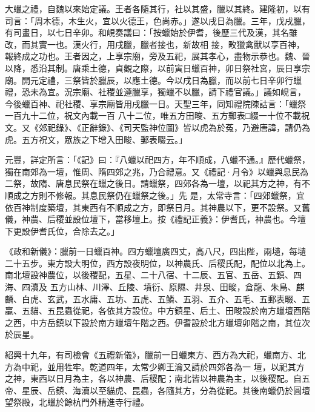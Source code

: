 \begin{pinyinscope}
 大蠟之禮，自魏以來始定議。王者各隨其行，社以其盛，臘以其終。建隆初，以有司言：「周木德，木生火，宜以火德王，色尚赤。」遂以戌日為臘。三年，戊戌臘，有司畫日，以七日辛卯。和峴奏議曰：「按蠟始於伊耆，後歷三代及漢，其名雖改，而其實一也。漢火行，用戌臘，臘者接也，新故相
 接，畋獵禽獸以享百神，報終成之功也。王者因之，上享宗廟，旁及五祀，展其孝心，盡物示恭也。魏、晉以降，悉沿其制。唐乘土德，貞觀之際，以前寅日蠟百神，卯日祭社宮，辰日享宗廟。開元定禮，三祭皆於臘辰，以應土德。今以戌日為臘，而以前七日辛卯行蠟禮，恐未為宜。況宗廟、社稷並遵臘享，獨蠟不以臘，請下禮官議。」議如峴言，今後蠟百神、祀社稷、享宗廟皆用戌臘一日。天聖三年，同知禮院陳詁言：「蠟祭一百九十二位，祝文內載一百
 八十二位，唯五方田畯、五方郵表□綴一十位不載祝文。又《郊祀錄》、《正辭錄》、《司天監神位圖》皆以虎為於菟，乃避唐諱，請仍為虎。五方祝文，眾族之下增入田畯、郵表畷云。」



 元豐，詳定所言：「《記》曰：『八蠟以祀四方，年不順成，八蠟不通。』歷代蠟祭，獨在南郊為一壇，惟周、隋四郊之兆，乃合禮意。又《禮記·月令》以蠟與息民為二祭，故隋、唐息民祭在蠟之後日。請蠟祭，四郊各為一壇，以祀其方之神，有不順成之方則不修報。其息民祭仍在蠟祭之後。」先
 是，太常寺言：「四郊蠟祭，宜依百神制度築壇，其東西有不順成之方，即祭日月。其神農以下，更不設祭。又舊儀，神農、后稷並設位壇下，當移壇上。按《禮記正義》：伊耆氏，神農也。今壇下更設伊耆氏位，合除去之。」



 《政和新儀》：臘前一日蠟百神。四方蠟壇廣四丈，高八尺，四出陛，兩壝，每壝二十五步。東方設大明位，西方設夜明位，以神農氏、后稷氏配，配位以北為上。南北壇設神農位，以後稷配，五星、二十八宿、十二辰、五官、五岳、五鎮、四海、四瀆及
 五方山林、川澤、丘陵、墳衍、原隰、井泉、田畯，倉龍、朱鳥、麒麟、白虎、玄武，五水庸、五坊、五虎、五鱗、五羽、五介、五毛、五郵表畷、五臝、五貓、五昆蟲從祀，各依其方設位。中方鎮星、后土、田畯設於南方蠟壇酉階之西，中方岳鎮以下設於南方蠟壇午階之西。伊耆設於北方蠟壇卯階之南，其位次於辰星。



 紹興十九年，有司檢會《五禮新儀》，臘前一日蠟東方、西方為大祀，蠟南方、北方為中祀，並用牲牢。乾道四年，太常少卿王瀹又請於四郊各為一
 壇，以祀其方之神，東西以日月為主，各以神農、后稷配；南北皆以神農為主，以後稷配。自五帝、星辰、岳鎮、海瀆以至貓虎、昆蟲，各隨其方，分為從祀。其後南蠟仍於圓壇望祭殿，北蠟於餘杭門外精進寺行禮。




\end{pinyinscope}
